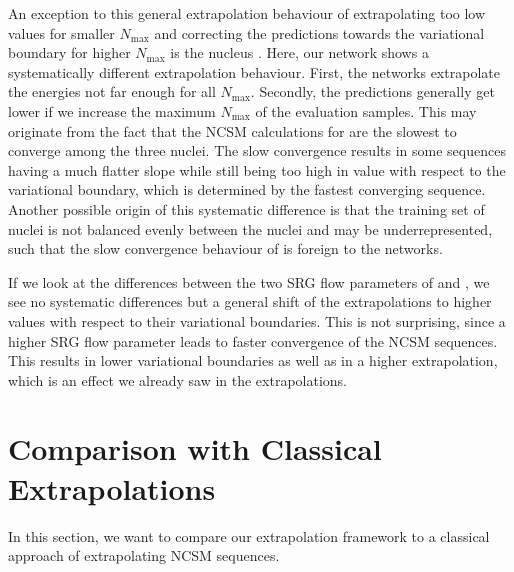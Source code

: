 An exception to this general extrapolation behaviour of extrapolating too low values for smaller $N_\mathrm{max}$ and correcting the predictions towards the variational boundary for higher $N_\mathrm{max}$ is the nucleus . Here, our network shows a systematically different extrapolation behaviour. First, the networks extrapolate the energies not far enough for all $N_\mathrm{max}$. Secondly, the predictions generally get lower if we increase the maximum $N_\mathrm{max}$ of the evaluation samples. This may originate from the fact that the NCSM calculations for  are the slowest to converge among the three nuclei. The slow convergence results in some sequences having a much flatter slope while still being too high in value with respect to the variational boundary, which is determined by the fastest converging sequence. Another possible origin of this systematic difference is that the training set of nuclei is not balanced evenly between the nuclei and  may be underrepresented, such that the slow convergence behaviour of  is foreign to the networks.

If we look at the differences between the two SRG flow parameters of  and , we see no systematic differences but a general shift of the extrapolations to higher values with respect to their variational boundaries. This is not surprising, since a higher SRG flow parameter leads to faster convergence of the NCSM sequences. This results in lower variational boundaries as well as in a higher extrapolation, which is an effect we already saw in the  extrapolations.




\section{Comparison with Classical Extrapolations}
In this section, we want to compare our extrapolation framework to a classical approach of extrapolating NCSM sequences.
